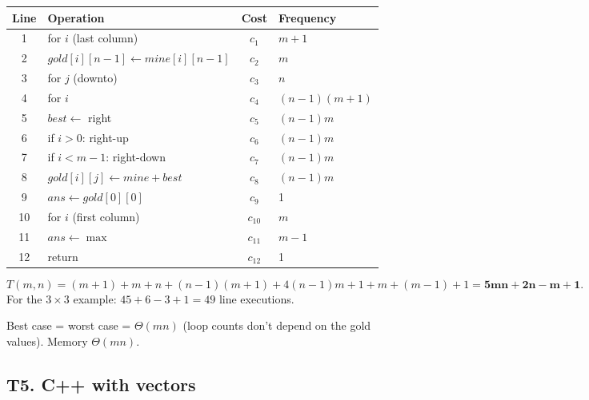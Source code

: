 \documentclass[11pt]{article}
\begin{document}
\begin{center}
\begin{tabular}{clcl}
\toprule
Line & Operation & Cost & Frequency \\
\midrule
1 & for $i$ (last column) & $c_1$ & $m+1$ \\
2 & $gold[i][n-1] \gets mine[i][n-1]$ & $c_2$ & $m$ \\
3 & for $j$ (downto) & $c_3$ & $n$ \\
4 & for $i$ & $c_4$ & $(n-1)(m+1)$ \\
5 & $best \gets$ right & $c_5$ & $(n-1)m$ \\
6 & if $i>0$: right-up & $c_6$ & $(n-1)m$ \\
7 & if $i<m-1$: right-down & $c_7$ & $(n-1)m$ \\
8 & $gold[i][j] \gets mine + best$ & $c_8$ & $(n-1)m$ \\
9 & $ans \gets gold[0][0]$ & $c_9$ & 1 \\
10 & for $i$ (first column) & $c_{10}$ & $m$ \\
11 & $ans \gets \max$ & $c_{11}$ & $m-1$ \\
12 & return & $c_{12}$ & 1 \\
\bottomrule
\end{tabular}
\end{center}

\[
T(m,n) = (m+1) + m + n + (n-1)(m+1) + 4(n-1)m + 1 + m + (m-1) + 1 = \mathbf{5mn + 2n - m + 1}.
\]
For the $3\times 3$ example: $45 + 6 - 3 + 1 = 49$ line executions.

Best case = worst case = $\Theta(mn)$ (loop counts don't depend on the gold values). Memory $\Theta(mn)$.

\subsection*{T5. C++ with vectors}
\end{document}
